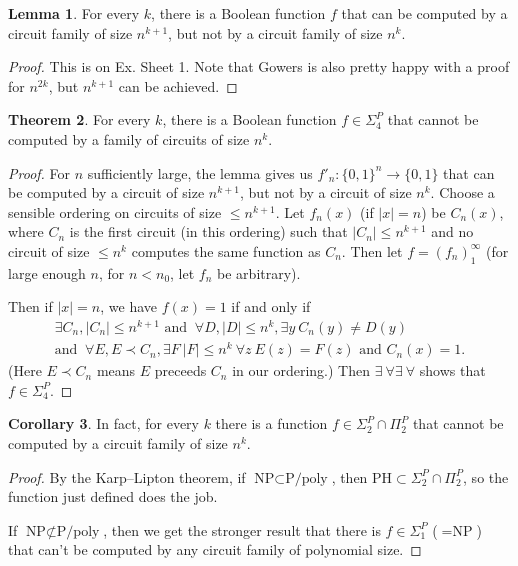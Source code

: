 \documentclass{article}
\theoremstyle{definition}
\newtheorem{theorem}{Theorem}[section]
\newtheorem{lemma}[theorem]{Lemma}
\newtheorem{cor}[theorem]{Corollary}
\begin{document}
\begin{lemma}
    For every $k$, there is a Boolean function $f$ that can be computed by a circuit family of size $n^{k+1}$, but not by a circuit family of size $n^k$.
\end{lemma}
\begin{proof}
    This is on Ex. Sheet 1. Note that Gowers is also pretty happy with a proof for $n^{2k}$, but $n^{k+1}$ can be achieved.
\end{proof}
\begin{theorem}
    For every $k$, there is a Boolean function $f \in \Sigma_4^P$ that cannot be computed by a family of circuits of size $n^k$.
\end{theorem}
\begin{proof}
    For $n$ sufficiently large, the lemma gives us $f'_n : \{0,1\}^n \to \{0,1\}$ that can be computed by a circuit of size $n^{k+1}$, but not by a circuit of size $n^k$. Choose a sensible ordering on circuits of size $\le n^{k+1}$. Let $f_n(x)$ (if $\left|x\right|=n$) be $C_n(x)$, where $C_n$ is the first circuit (in this ordering) such that $\left|C_n\right|\le n^{k+1}$ and no circuit of size $\le n^k$ computes the same function as $C_n$. Then let $f = (f_n)_1^\infty$ (for large enough $n$, for $n<n_0$, let $f_n$ be arbitrary).
    \vspace{1mm}
     
    Then if $\left|x\right|=n$, we have $f(x)=1$ if and only if 
    \begin{align*}
        \exists C_n, \left|C_n\right|\le n^{k+1} \text{ and }~\forall D, \left|D\right|\le n^k, \exists y ~ C_n(y) \neq D(y) \\
        \text{and } ~\forall E, E \prec C_n, \exists F ~ \left|F\right|\le n^k ~\forall z ~ E(z)=F(z) \text{ and }C_n(x)=1.
    \end{align*}
    (Here $E \prec C_n$ means $E$ preceeds $C_n$ in our ordering.) Then $\exists ~\forall \exists ~\forall $ shows that $f \in \Sigma_4^P$.
\end{proof}
\begin{cor}
    In fact, for every $k$ there is a function $f \in \Sigma_2^P \cap \Pi_2^P$ that cannot be computed by a circuit family of size $n^k$.
\end{cor}
\begin{proof}
    By the Karp--Lipton theorem, if $\text{NP} \subset \text{P/poly}$, then $\text{PH} \subset \Sigma_2^P \cap \Pi_2^P$, so the function just defined does the job.
    \vspace{1mm}
     
    If $\text{NP} \not\subset \text{P/poly}$, then we get the stronger result that there is $f \in \Sigma_1^P$ ($=\text{NP}$) that can't be computed by any circuit family of polynomial size.
\end{proof}
\end{document}
